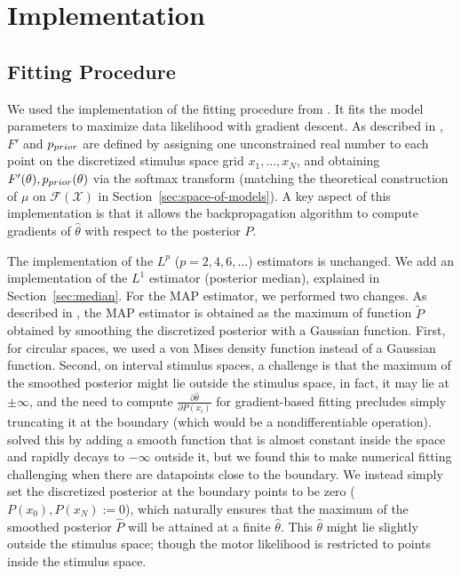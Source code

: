 



\section{Implementation}

\subsection{Fitting Procedure}

We used the implementation of the fitting procedure from \citet{hahn2024unifying}.
It fits the model parameters to maximize data likelihood with gradient descent.
As described in \citet{hahn2024unifying}, $F'$ and $p_{prior}$ are defined by assigning one unconstrained real number to each point on the discretized stimulus space grid $x_1, \dots, x_N$, and obtaining $F'(\theta), p_{prior}(\theta)$ via the softmax transform (matching the theoretical construction of $\mu$ on $\mathcal{F}(\mathcal{X})$ in Section~\ref{sec:space-of-models}).
A key aspect of this implementation is that it allows the backpropagation algorithm to compute gradients of $\widehat{\theta}$ with respect to the posterior $P$.

The implementation of the $L^p$ ($p=2,4,6,\dots$) estimators is unchanged.
We add an implementation of the $L^1$ estimator (posterior median), explained in Section~\ref{sec:median}.
For the MAP estimator, we performed two changes.
As described in \citet{hahn2024unifying}, the MAP estimator is obtained as the maximum of function $\tilde{P}$ obtained by smoothing the discretized posterior with a Gaussian function.
First, for circular spaces, we used a von Mises density function instead of a Gaussian function.
Second, on interval stimulus spaces, a challenge is that the maximum of the smoothed posterior might lie outside the stimulus space, in fact, it may lie at $\pm \infty$, and the need to compute $\frac{\partial \widehat{\theta}}{\partial P(x_i)}$ for gradient-based fitting precludes simply truncating it at the boundary (which would be a nondifferentiable operation). \citet{hahn2024unifying} solved this by adding a smooth function that is almost constant inside the space and rapidly decays to $-\infty$ outside it, but we found this to make numerical fitting challenging when there are datapoints close to the boundary.
We instead simply set the discretized posterior at the boundary points to be zero ($P(x_0), P(x_N) := 0$), which naturally ensures that the maximum of the smoothed posterior $\widehat{P}$ will be attained at a finite $\widehat{\theta}$. This $\widehat{\theta}$ might lie slightly outside the stimulus space; though the motor likelihood is restricted to points inside the stimulus space.

